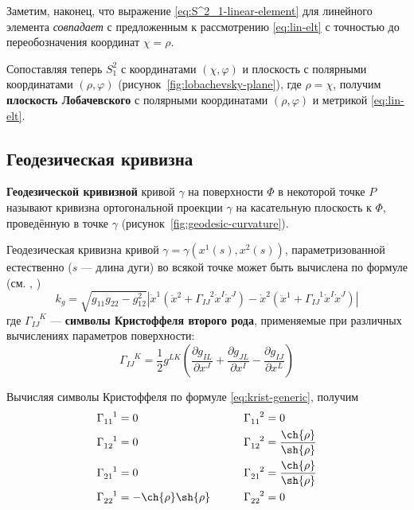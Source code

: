 \documentclass{article}
\numberwithin{equation}{section}
\renewcommand{\phi}{\varphi}
\newcommand{\krist}[3]{\Gamma^{\phantom{#1 #2}#3}_{#1 #2}}
\newcommand{\neword}[1]{\textbf{#1}}
\providecommand{\abs}[1]{\left \lvert{#1}\right \rvert}
\begin{document}
Заметим, наконец, что выражение \eqref{eq:S^2_1-linear-element} для
линейного элемента \emph{совпадает} с предложенным к рассмотрению
\eqref{eq:lin-elt} с точностью до переобозначения координат $\chi =
\rho$.

Сопоставляя теперь $S^2_1$ с координатами $(\chi, \phi)$ и плоскость с
полярными координатами $(\rho, \phi)$
(рисунок \ref{fig:lobachevsky-plane}), где $\rho=\chi$, получим
\neword{плоскость Лобачевского} с полярными координатами $(\rho,
\phi)$ и метрикой \eqref{eq:lin-elt}.

\subsection{Геодезическая кривизна}

\neword{Геодезической кривизной} кривой $\gamma$ на поверхности $\Phi$
в некоторой точке $P$ называют кривизна ортогональной проекции
$\gamma$ на касательную плоскость к $\Phi$, проведённую в точке
$\gamma$ (рисунок \ref{fig:geodesic-curvature}).



Геодезическая кривизна кривой $\gamma = \gamma(x^1(s), x^2(s))$,
параметризованной естественно ($s$ — длина дуги) во всякой точке может
быть вычислена по формуле (см. \cite{pogorelov74}, \cite{rashevsky50})
\begin{equation}\label{eq:geodesic-curvature}
  k_g = \sqrt{g_{11} g_{22} - g_{12}^2}\abs{\dot{x}^1 (\ddot{x}^2 +
    \krist{I}{J}{2} \dot{x}^I \dot{x}^J) - \dot{x}^2 (\ddot{x}^1 +
    \krist{I}{J}{1} \dot{x}^I \dot{x}^J)}
\end{equation}
где $\krist{I}{J}{K}$ — \neword{символы Кристоффеля второго рода},
применяемые при различных вычислениях параметров поверхности:
\begin{equation}\label{eq:krist-generic}
  \krist{I}{J}{K} = \frac{1}{2} g^{LK} \left (
    \frac{\partial{g_{IL}}}{\partial{x^J}} +
    \frac{\partial{g_{JL}}}{\partial{x^I}} -
    \frac{\partial{g_{IJ}}}{\partial{x^L}} \right )
\end{equation}

Вычисляя символы Кристоффеля по формуле \eqref{eq:krist-generic},
получим
\begin{equation}\label{eq:krist}
  \begin{aligned}
    \krist{1}{1}{1} &= 0 &\qquad \krist{1}{1}{2} &= 0 \\
    \krist{1}{2}{1} &= 0 &\qquad \krist{1}{2}{2} &= \frac{\ch{\rho}}{\sh{\rho}} \\
    \krist{2}{1}{1} &= 0 &\qquad \krist{2}{1}{2} &= \frac{\ch{\rho}}{\sh{\rho}} \\
    \krist{2}{2}{1} &= -\ch{\rho} \sh{\rho} &\qquad \krist{2}{2}{2} & = 0
  \end{aligned}
\end{equation}
  
\end{document}
